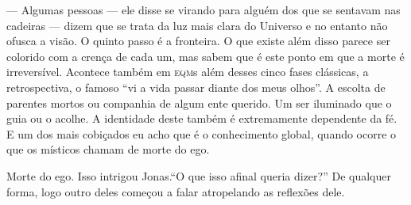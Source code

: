 --- Algumas pessoas --- ele disse se virando para alguém dos que se sentavam nas cadeiras --- dizem que se trata da luz mais clara do Universo e no entanto não ofusca a visão. O quinto passo é a fronteira. O que existe além disso parece ser colorido com a crença de cada um, mas sabem que é este ponto em que a morte é irreversível. Acontece também em \textsc{eqm}s além desses cinco fases clássicas, a retrospectiva, o famoso ``vi a vida passar diante dos meus olhos''. A escolta de parentes mortos ou companhia de algum ente querido. Um ser iluminado que o guia ou o acolhe. A identidade deste também é extremamente dependente da fé. E um dos mais cobiçados eu acho que é o conhecimento global, quando ocorre o que os místicos chamam de morte do ego.

Morte do ego. Isso intrigou Jonas.``O que isso afinal queria dizer?'' De qualquer forma, logo outro deles começou a falar atropelando as reflexões dele.

